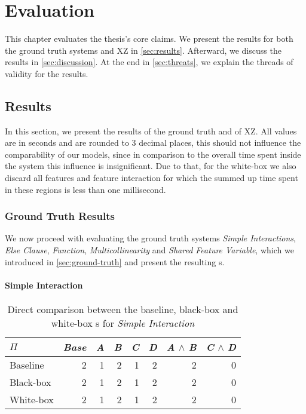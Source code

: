 \chapter{Evaluation}\label{ch:evaluation}
\lstset{style=myStyle}

This chapter evaluates the thesis's core claims.  
We present the results for both the ground truth systems and \textsc{XZ} in \autoref{sec:results}.
Afterward, we discuss the results in \autoref{sec:discussion}. At the end in \autoref{sec:threats}, we explain the threads of validity for the results.

\section{Results}\label{sec:results}

In this section, we present the results of the ground truth and of \textsc{XZ}. 
All values are in seconds and are rounded to 3 decimal places, this should not influence the comparability of our models, since in comparison
to the overall time spent inside the system this influence is insignificant. Due to that, for the white-box we also discard all features
and feature interaction for which the summed up time spent in these regions is less than one millisecond.

\subsection{Ground Truth Results}
We now proceed with evaluating the ground truth systems \emph{Simple Interactions}, \emph{Else Clause}, \emph{Function}, \emph{Multicollinearity} 
and \emph{Shared Feature Variable}, which we introduced in \autoref{sec:ground-truth} and present the resulting {\perfInfluenceModel}s.

\subsubsection*{Simple Interaction}

\begin{table}[H]
    \centering
    \begin{tabular}{lrrrrrrr}
    \toprule
    $\Pi$    & \emph{Base} & \emph{A} & \emph{B} & \emph{C} & \emph{D} & \emph{A} $\land$ \emph{B} & \emph{C} $\land$ \emph{D}  \\ \midrule
    Baseline & 2    & 1 & 2 & 1 & 2 & 2           & 0            \\
    Black-box & 2    & 1 & 2 & 1 & 2 & 2           & 0           \\
    White-box & 2    & 1 & 2 & 1 & 2 & 2           & 0           \\ \bottomrule
    \end{tabular}  
    \caption{Direct comparison between the baseline, black-box and white-box {\perfInfluenceModel}s for \emph{Simple Interaction}}\label{aggr:results-simple-interaction}
\end{table}

